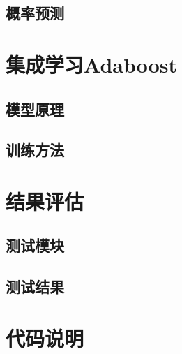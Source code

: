 \documentclass[12pt]{article} %
\begin{document}
\begin{sloppypar}
\subsection{概率预测}


\newpage
\section{集成学习Adaboost}

\subsection{模型原理}

\subsection{训练方法}



\newpage
\section{结果评估}

\subsection{测试模块}

\subsection{测试结果}

\section{代码说明}

\newpage
 


\end{sloppypar}
\end{document}
